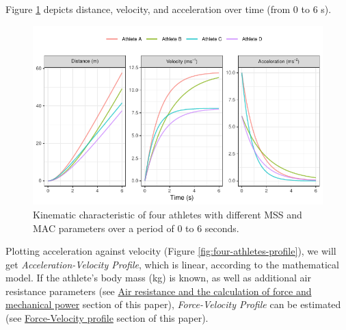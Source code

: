 \documentclass[fleqn,10pt]{wlpeerj} %
\begin{document}
\normalsize

Figure \ref{fig:four-athletes-kinematics} depicts distance, velocity, and acceleration over time (from 0 to 6 s).

\small

\begin{figure}

{\centering \includegraphics[width=0.9\linewidth]{paper_files/figure-latex/four-athletes-kinematics-1} 

}

\caption{Kinematic characteristic of four athletes with different MSS and MAC parameters over a period of 0 to 6 seconds.}\label{fig:four-athletes-kinematics}
\end{figure}

\normalsize

Plotting acceleration against velocity (Figure \ref{fig:four-athletes-profile}), we will get \emph{Acceleration-Velocity Profile}, which is linear, according to the mathematical model. If the athlete's body mass (kg) is known, as well as additional air resistance parameters (see \protect\hyperlink{air-resistance-and-the-calculation-of-force-and-mechanical-power}{Air resistance and the calculation of force and mechanical power} section of this paper), \emph{Force-Velocity Profile} can be estimated (see \protect\hyperlink{force-velocity-profile}{Force-Velocity profile} section of this paper).

\small
\end{document}
